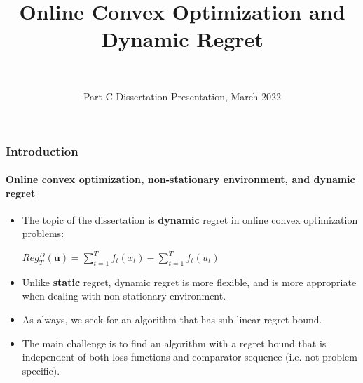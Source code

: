 \documentclass{beamer}
\title[Dynamic regret and online convex optimization]{Online Convex Optimization and Dynamic Regret}
\author%
{%
    \sc{Wonsuk Yang}\\
}
\institute%
{%
    \textit{University of Oxford}
}
\date[Mar 2022]{Part C Dissertation Presentation, March 2022} %
\begin{document}
    \begin{frame}[plain]
        \titlepage
    \end{frame}
    \begin{frame}
        \frametitle{Introduction}
        \framesubtitle{Online convex optimization, non-stationary environment, and dynamic regret}
        \begin{itemize}
            \item The topic of the dissertation is \textbf{dynamic} regret in online convex optimization problems:
            \begin{center}
                $Reg_{T}^{D}(\mathbf{u}) = \sum_{t=1}^{T} f_{t}(x_t) - \sum_{t=1}^{T} f_{t}(u_t)$
            \end{center}
            \item Unlike \textbf{static} regret, dynamic regret is more flexible, and is more appropriate when dealing with non-stationary environment.
            \item As always, we seek for an algorithm that has sub-linear regret bound. 
            \item The main challenge is to find an algorithm with a regret bound that is independent of both loss functions and comparator sequence (i.e. not problem specific).
        \end{itemize}
    \end{frame}
\end{document}

